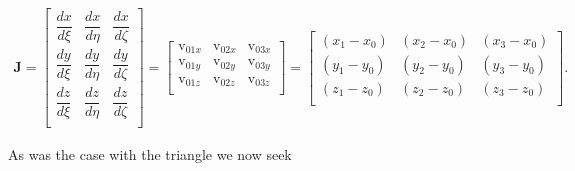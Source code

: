 \documentclass[11pt,letterpaper,titlepage]{article}
\newcommand{\beqn}{\begin{equation}
	\begin{aligned}}
\newcommand{\eeqn}{\end{aligned}
	\end{equation}}
\begin{document}
\begingroup
\renewcommand*{\arraystretch}{1.5}
\beqn \label{eq:jacobiantetrahedron} 
\mathbf{J }= 
\begin{bmatrix}
\dfrac{dx}{d\xi}     & \dfrac{dx}{d\eta}  &  \dfrac{dx}{d\zeta} \\
\dfrac{dy}{d\xi}     & \dfrac{dy}{d\eta}  &  \dfrac{dy}{d\zeta} \\
\dfrac{dz}{d\xi}     & \dfrac{dz}{d\eta}  &  \dfrac{dz}{d\zeta} \\
\end{bmatrix}=
\begin{bmatrix}
\text{v}_{01x}  & \text{v}_{02x} & \text{v}_{03x}  \\
\text{v}_{01y}  & \text{v}_{02y} & \text{v}_{03y}  \\
\text{v}_{01z}  & \text{v}_{02z} & \text{v}_{03z}  \\
\end{bmatrix}
=
\begin{bmatrix}
(x_1 - x_0) & (x_2 - x_0) & (x_3-x_0) \\
(y_1 - y_0)  & (y_2 - y_0) & (y_3-y_0) \\
(z_1 - z_0)  & (z_2 - z_0) & (z_3-z_0) \\
\end{bmatrix}.
\eeqn
\endgroup
\newline

As was the case with the triangle we now seek
\end{document}
